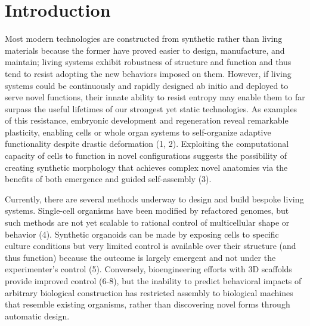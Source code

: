 



\section{Introduction}

Most modern technologies are constructed from synthetic rather than living materials because the former have proved easier to design, manufacture, and maintain; living systems exhibit robustness of structure and function and thus tend to resist adopting the new behaviors imposed on them. However, if living systems could be continuously and rapidly designed ab initio and deployed to serve novel functions, their innate ability to resist entropy may enable them to far surpass the useful lifetimes of our strongest yet static technologies. As examples of this resistance, embryonic development and regeneration reveal remarkable plasticity, enabling cells or whole organ systems to self-organize adaptive functionality despite drastic deformation (1, 2). Exploiting the computational capacity of cells to function in novel configurations suggests the possibility of creating synthetic morphology that achieves complex novel anatomies via the benefits of both emergence and guided self-assembly (3).

Currently, there are several methods underway to design and build bespoke living systems. Single-cell organisms have been modified by refactored genomes, but such methods are not yet scalable to rational control of multicellular shape or behavior (4). Synthetic organoids can be made by exposing cells to specific culture conditions but very limited control is available over their structure (and thus function) because the outcome is largely emergent and not under the experimenter's control (5). Conversely, bioengineering efforts with 3D scaffolds provide improved control (6-8), but the inability to predict behavioral impacts of arbitrary biological construction has restricted assembly to biological machines that resemble existing organisms, rather than discovering novel forms through automatic design.

